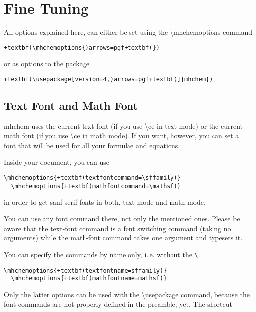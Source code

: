 \documentclass[a4paper,notitlepage,parskip=half]{scrreprt}
\newcommand\macro[1]{\mbox{\ttfamily\textbackslash#1}}
\begin{document}
\section{Fine Tuning}\label{sec:FineTuning}

All options explained here, can either be set using the \macro{mhchemoptions} command

\begin{Verbatim}[commandchars=+()]
  +textbf(\mhchemoptions{)arrows=pgf+textbf(})
\end{Verbatim}

or as options to the package

\begin{Verbatim}[commandchars=+()]
  +textbf(\usepackage[version=4,)arrows=pgf+textbf(]{mhchem})
\end{Verbatim}


\subsection{Text Font and Math Font} \label{sec:Fonts}

mhchem uses the current text font (if you use \macro{ce} in text mode) or the  current math font (if you use \macro{ce} in math mode). If you want, however, you can set a font that will be used for all your formulae and equations.

Inside your document, you can use

\begin{Verbatim}[commandchars=+()]
  \mhchemoptions{+textbf(textfontcommand=\sffamily)}
  \mhchemoptions{+textbf(mathfontcommand=\mathsf)}
\end{Verbatim}

in order to get sanf-serif fonts in both, text mode and math mode.

You can use any font command there, not only the mentioned ones. Please be aware that the text-font command is a font switching command (taking no arguments) while the math-font command takes one argument and typesets it.

You can specify the commands by name only, i.\,e. without the \verb|\|.

\begin{Verbatim}[commandchars=+()]
  \mhchemoptions{+textbf(textfontname=sffamily)}
  \mhchemoptions{+textbf(mathfontname=mathsf)}
\end{Verbatim}

\noindent
Only the latter options can be used with the \macro{usepackage} command, because the font commands are not properly defined in the preamble, yet. The shortcut
\end{document}

